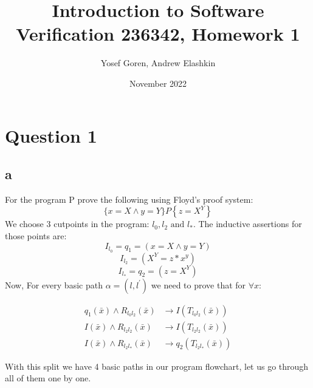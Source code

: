 \documentclass{article}
\begin{document}
\author{Yosef Goren, Andrew Elashkin}
\date{November 2022}
\title{Introduction to Software Verification 236342, Homework 1}
\maketitle
\section*{Question 1}
\subsection*{a}
For the program P prove the following using Floyd's proof system:
$$
\{x=X \wedge y=Y\} P\left\{z=X^Y\right\}
$$
We choose 3 cutpoints in the program: $l_0, l_2 \text{ and } l_*$. The inductive assertions for those points are:
$$ I_{l_0} = q_1 = (x=X \wedge y=Y)$$
$$ I_{l_2}=(X^Y= z*x^y) $$
$$ I_{l_*} = q_2 =(z=X^Y) $$
Now, For every basic path $\alpha=\left(l, l^{\prime}\right)$ we need to prove that for $\forall x$: 

\begin{align}
q_1(\bar{x}) \wedge R_{l_0 l_2}(\bar{x}) &\rightarrow I\left(T_{l_0 l_2}(\bar{x})\right) \\
I(\bar{x}) \wedge R_{l_2 l_2}(\bar{x}) &\rightarrow I\left(T_{l_2 l_2}(\bar{x})\right) \\
I(\bar{x}) \wedge R_{l_2 l_*}(\bar{x}) &\rightarrow q_2\left(T_{l_2 l_*}(\bar{x})\right)
\end{align}

With this split we have 4 basic paths in our program flowchart, let us go through all of them one by one.
\end{document}
